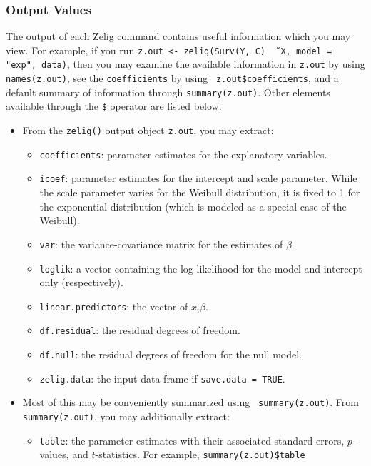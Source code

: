\begin{itemize}
\end{itemize}

\subsubsection{Output Values}

The output of each Zelig command contains useful information which you
may view.  For example, if you run \texttt{z.out <- zelig(Surv(Y,
  C) \~\, X, model = "exp", data)}, then you may examine the
available information in \texttt{z.out} by using
\texttt{names(z.out)}, see the {\tt coefficients} by using {\tt
  z.out\$coefficients}, and a default summary of information
through \texttt{summary(z.out)}.  Other elements available through
the {\tt \$} operator are listed below.

\begin{itemize}
\item From the {\tt zelig()} output object {\tt z.out}, you may extract:
   \begin{itemize}
   \item {\tt coefficients}: parameter estimates for the explanatory
     variables.
   \item {\tt icoef}: parameter estimates for the intercept and scale
     parameter.  While the scale parameter varies for the Weibull
     distribution, it is fixed to 1 for the exponential distribution
     (which is modeled as a special case of the Weibull).  
   \item {\tt var}: the variance-covariance matrix for the estimates
     of $\beta$.  
   \item {\tt loglik}: a vector containing the log-likelihood for the
     model and intercept only (respectively).
   \item {\tt linear.predictors}: the vector of
     $x_{i}\beta$.
   \item {\tt df.residual}: the residual degrees of freedom.
   \item {\tt df.null}: the residual degrees of freedom for the null
     model. 
   \item {\tt zelig.data}: the input data frame if {\tt save.data = TRUE}.  
   \end{itemize}

\item Most of this may be conveniently summarized using {\tt
   summary(z.out)}.  From {\tt summary(z.out)}, you may
 additionally extract: 
   \begin{itemize}
   \item {\tt table}: the parameter estimates with their
     associated standard errors, $p$-values, and $t$-statistics.  For
     example, {\tt summary(z.out)\$table}
   \end{itemize}


\end{itemize}
